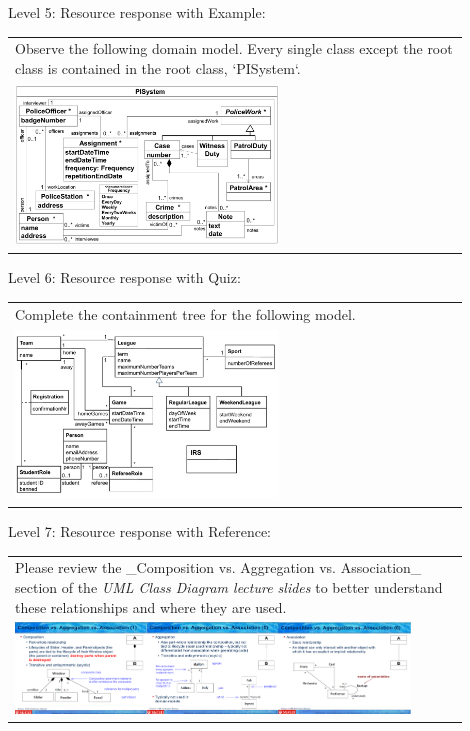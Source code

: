 \noindent Level 5: Resource response with Example: \medskip

\begin{tabular}{|p{0.9\linewidth}}
Observe the following domain model. Every single class except the root class is contained in the 
root class, `PISystem`.

\\
\includegraphics[width=0.6\textwidth]{images/PISystem.png}
\end{tabular} \medskip

\noindent Level 6: Resource response with Quiz: \medskip

\begin{tabular}{|p{0.9\linewidth}}
Complete the containment tree for the following model.

\\
\includegraphics[width=0.6\textwidth]{images/IRS.png}
\end{tabular} \medskip

\noindent Level 7: Resource response with Reference: \medskip

\begin{tabular}{|p{0.9\linewidth}}
Please review the _Composition vs. Aggregation vs. Association_ section of 
the \textit{UML Class Diagram lecture slides} to 
better understand these relationships and where they are used.

\\
\includegraphics[width=0.9\textwidth]{images/composition_aggregation_association.png}
\end{tabular} \medskip


